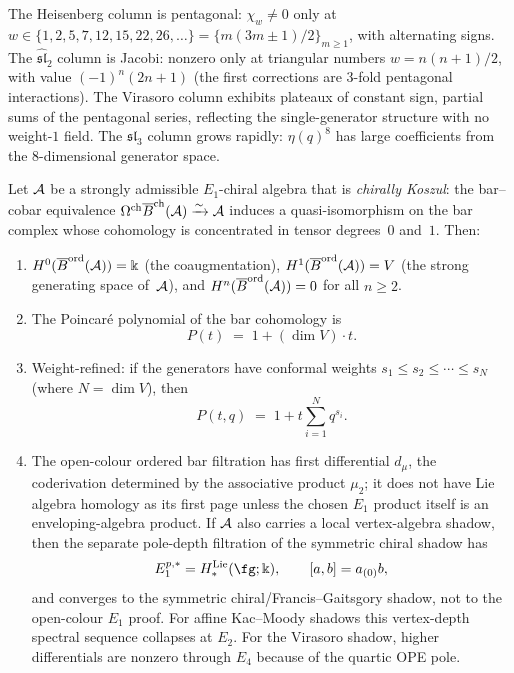 \begin{computation}
The Heisenberg column is pentagonal: $\chi_w\ne 0$ only at
$w\in\{1,2,5,7,12,15,22,26,\ldots\}=\{m(3m{\pm}1)/2\}_{m\ge 1}$,
with alternating signs. The $\widehat{\mathfrak{sl}}_2$
column is Jacobi: nonzero only at triangular numbers
$w=n(n{+}1)/2$, with value $(-1)^n(2n{+}1)$ (the first
corrections are $3$-fold pentagonal interactions). The
Virasoro column exhibits plateaux of constant sign,
partial sums of the pentagonal series, reflecting the
single-generator structure with no weight-$1$ field.
The $\mathfrak{sl}_3$ column grows rapidly:
$\eta(q)^8$ has large coefficients from the $8$-dimensional
generator space.
\end{computation}

\begin{theorem}
\label{thm:bar-cohomology-concentration}
Let $\mathcal{A}$ be a strongly admissible $E_1$-chiral algebra that
is \emph{chirally Koszul}: the bar--cobar equivalence
$\Omega^{\mathrm{ch}}\overline{B}^{\mathrm{ch}}(\mathcal{A})\xrightarrow{\sim}\mathcal{A}$ induces a
quasi-isomorphism on the bar complex whose cohomology
is concentrated in tensor degrees~$0$ and~$1$. Then:
\begin{enumerate}[label=\textup{(\roman*)}]
\item $H^0(\overline{B}^{\mathrm{ord}}(\mathcal{A}))=\Bbbk$ (the
 coaugmentation), $H^1(\overline{B}^{\mathrm{ord}}(\mathcal{A}))=V$
 (the strong generating space of~$\mathcal{A}$), and
 $H^n(\overline{B}^{\mathrm{ord}}(\mathcal{A}))=0$ for all $n\ge 2$.
\item The Poincar\'e polynomial of the bar cohomology is
 \begin{equation}\label{eq:poincare-bar}
 P(t)\;=\;1+(\dim V)\cdot t.
 \end{equation}
\item Weight-refined: if the generators have conformal
 weights $s_1\le s_2\le\cdots\le s_N$ (where $N=\dim V$),
 then
 \begin{equation}\label{eq:poincare-bar-refined}
 P(t,q)\;=\;1+t\sum_{i=1}^N q^{s_i}.
 \end{equation}
\item The open-colour ordered bar filtration has first differential
 \(d_\mu\), the coderivation determined by the associative product
 \(\mu_2\); it does not have Lie algebra homology as its first page
 unless the chosen \(E_1\) product itself is an enveloping-algebra
 product.  If \(\mathcal{A}\) also carries a local vertex-algebra shadow, then
 the separate pole-depth filtration of the symmetric chiral shadow has
 \[
 E_1^{p,*}=H_*^{\mathrm{Lie}}(\fg;\Bbbk),
 \qquad [a,b]=a_{(0)}b,
 \]
 and converges to the symmetric chiral\slash Francis--Gaitsgory shadow,
 not to the open-colour \(E_1\) proof.  For affine Kac--Moody shadows
 this vertex-depth spectral sequence collapses at \(E_2\).  For the
 Virasoro shadow, higher differentials are nonzero through \(E_4\)
 because of the quartic OPE pole.
\end{enumerate}
\end{theorem}

